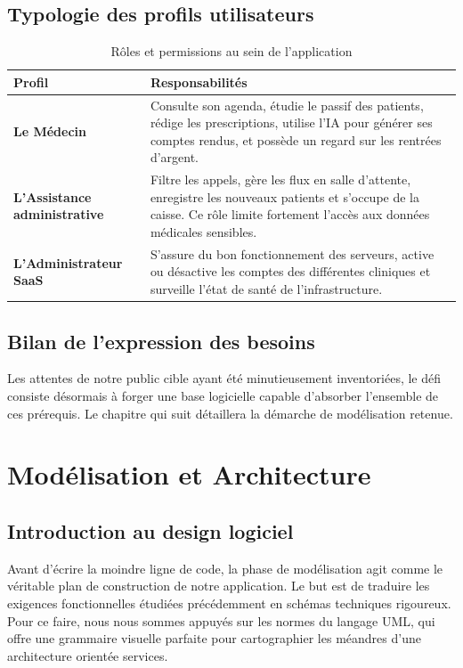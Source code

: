 \documentclass[final]{report}
\begin{document}
\section{Typologie des profils utilisateurs}
\begin{table}[H]
\centering
\caption{Rôles et permissions au sein de l'application}
\renewcommand{\arraystretch}{1.4}
\begin{tabularx}{\textwidth}{|>{\bfseries}p{3cm}|X|}
\hline
\textbf{Profil} & \textbf{Responsabilités} \\
\hline
Le Médecin &
  Consulte son agenda, étudie le passif des patients, rédige les prescriptions, utilise l'IA pour générer ses comptes rendus, et possède un regard sur les rentrées d'argent. \\
\hline
L'Assistance administrative &
  Filtre les appels, gère les flux en salle d'attente, enregistre les nouveaux patients et s'occupe de la caisse. Ce rôle limite fortement l'accès aux données médicales sensibles. \\
\hline
L'Administrateur SaaS &
  S'assure du bon fonctionnement des serveurs, active ou désactive les comptes des différentes cliniques et surveille l'état de santé de l'infrastructure. \\
\hline
\end{tabularx}
\end{table}
 
\section{Bilan de l'expression des besoins}
Les attentes de notre public cible ayant été minutieusement inventoriées, le défi consiste désormais à forger une base logicielle capable d'absorber l'ensemble de ces prérequis. Le chapitre qui suit détaillera la démarche de modélisation retenue.
 

\chapter{Modélisation et Architecture}
 
\section{Introduction au design logiciel}
Avant d'écrire la moindre ligne de code, la phase de modélisation agit comme le véritable plan de construction de notre application. Le but est de traduire les exigences fonctionnelles étudiées précédemment en schémas techniques rigoureux. Pour ce faire, nous nous sommes appuyés sur les normes du langage UML, qui offre une grammaire visuelle parfaite pour cartographier les méandres d'une architecture orientée services.
 
\end{document}
